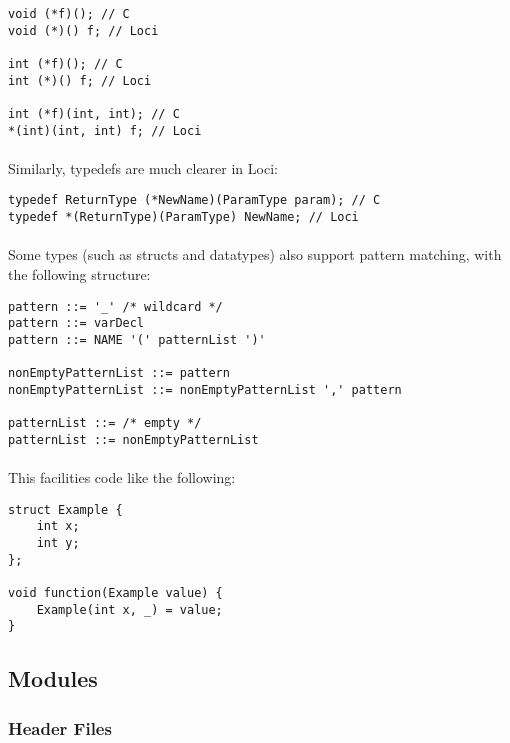 \documentclass[12pt,twoside,notitlepage]{report}
\begin{document}
\begin{lstlisting}
void (*f)(); // C
void (*)() f; // Loci

int (*f)(); // C
int (*)() f; // Loci

int (*f)(int, int); // C
*(int)(int, int) f; // Loci
\end{lstlisting}


\paragraph{}
Similarly, typedefs are much clearer in Loci:

\begin{lstlisting}
typedef ReturnType (*NewName)(ParamType param); // C
typedef *(ReturnType)(ParamType) NewName; // Loci
\end{lstlisting}

\paragraph{}
Some types (such as structs and datatypes) also support pattern matching, with the following structure:

\begin{lstlisting}
pattern ::= '_' /* wildcard */
pattern ::= varDecl
pattern ::= NAME '(' patternList ')'

nonEmptyPatternList ::= pattern
nonEmptyPatternList ::= nonEmptyPatternList ',' pattern

patternList ::= /* empty */
patternList ::= nonEmptyPatternList
\end{lstlisting}

\paragraph{}
This facilities code like the following:

\begin{lstlisting}
struct Example {
	int x;
	int y;
};

void function(Example value) {
	Example(int x, _) = value;
}
\end{lstlisting}

\clearpage

\subsection{Modules}

\subsubsection{Header Files}
\end{document}
